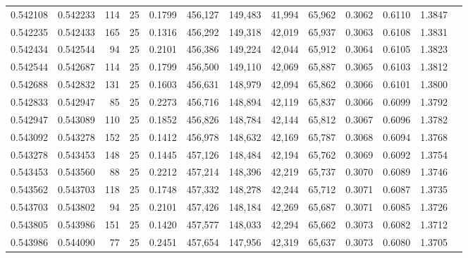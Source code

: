 \begin{tabular}{rrrrrrrrrrrrr}
0.542108 & 0.542233 &   114 &  25 &                                     0.1799 & 456,127 & 149,483 &  41,994 &  65,962 & 0.3062 & 0.6110 & 1.3847 \\
0.542235 & 0.542433 &   165 &  25 &                                     0.1316 & 456,292 & 149,318 &  42,019 &  65,937 & 0.3063 & 0.6108 & 1.3831 \\
0.542434 & 0.542544 &    94 &  25 &                                     0.2101 & 456,386 & 149,224 &  42,044 &  65,912 & 0.3064 & 0.6105 & 1.3823 \\
0.542544 & 0.542687 &   114 &  25 &                                     0.1799 & 456,500 & 149,110 &  42,069 &  65,887 & 0.3065 & 0.6103 & 1.3812 \\
0.542688 & 0.542832 &   131 &  25 &                                     0.1603 & 456,631 & 148,979 &  42,094 &  65,862 & 0.3066 & 0.6101 & 1.3800 \\
0.542833 & 0.542947 &    85 &  25 &                                     0.2273 & 456,716 & 148,894 &  42,119 &  65,837 & 0.3066 & 0.6099 & 1.3792 \\
0.542947 & 0.543089 &   110 &  25 &                                     0.1852 & 456,826 & 148,784 &  42,144 &  65,812 & 0.3067 & 0.6096 & 1.3782 \\
0.543092 & 0.543278 &   152 &  25 &                                     0.1412 & 456,978 & 148,632 &  42,169 &  65,787 & 0.3068 & 0.6094 & 1.3768 \\
0.543278 & 0.543453 &   148 &  25 &                                     0.1445 & 457,126 & 148,484 &  42,194 &  65,762 & 0.3069 & 0.6092 & 1.3754 \\
0.543453 & 0.543560 &    88 &  25 &                                     0.2212 & 457,214 & 148,396 &  42,219 &  65,737 & 0.3070 & 0.6089 & 1.3746 \\
0.543562 & 0.543703 &   118 &  25 &                                     0.1748 & 457,332 & 148,278 &  42,244 &  65,712 & 0.3071 & 0.6087 & 1.3735 \\
0.543703 & 0.543802 &    94 &  25 &                                     0.2101 & 457,426 & 148,184 &  42,269 &  65,687 & 0.3071 & 0.6085 & 1.3726 \\
0.543805 & 0.543986 &   151 &  25 &                                     0.1420 & 457,577 & 148,033 &  42,294 &  65,662 & 0.3073 & 0.6082 & 1.3712 \\
0.543986 & 0.544090 &    77 &  25 &                                     0.2451 & 457,654 & 147,956 &  42,319 &  65,637 & 0.3073 & 0.6080 & 1.3705 \\

\end{tabular}
